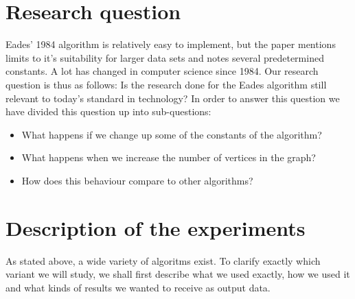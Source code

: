 \documentclass[a4paper,12pt]{article}
\begin{document}
\section{Research question}\label{s:question}
Eades' 1984 algorithm\cite{Eades} is relatively easy to implement, but the paper mentions limits to it's suitability for larger data sets and notes several predetermined constants. A lot has changed in computer science since 1984. Our research question is thus as follows: Is the research done for the Eades algorithm still relevant to today's standard in technology? In order to answer this question we have divided this question up into sub-questions:
\begin{itemize}
\item What happens if we change up some of the constants of the algorithm?
\item What happens when we increase the number of vertices in the graph?
\item How does this behaviour compare to other algorithms?
\end{itemize}

\section{Description of the experiments}
As stated above, a wide variety of algoritms exist. To clarify exactly which variant we will study, we shall first describe what we used exactly, how we used it and what kinds of results we wanted to receive as output data.
\end{document}
